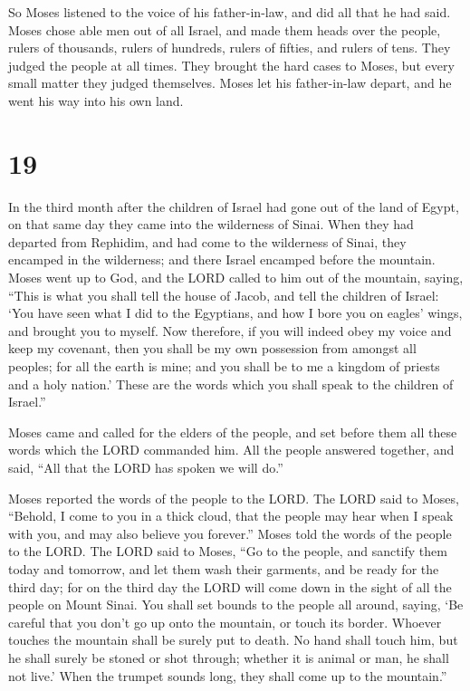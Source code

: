  So Moses listened to the voice of his father-in-law, and
did all that he had said.  Moses chose able men out of all
Israel, and made them heads over the people, rulers of thousands, rulers
of hundreds, rulers of fifties, and rulers of tens.  They
judged the people at all times. They brought the hard cases to Moses,
but every small matter they judged themselves.  Moses let
his father-in-law depart, and he went his way into his own land.

\hypertarget{section-18}{%
\section{19}\label{section-18}}

 In the third month after the children of Israel had gone
out of the land of Egypt, on that same day they came into the wilderness
of Sinai.  When they had departed from Rephidim, and had
come to the wilderness of Sinai, they encamped in the wilderness; and
there Israel encamped before the mountain.  Moses went up to
God, and the LORD called to him out of the mountain, saying, ``This is
what you shall tell the house of Jacob, and tell the children of Israel:
 `You have seen what I did to the Egyptians, and how I bore
you on eagles' wings, and brought you to myself.  Now
therefore, if you will indeed obey my voice and keep my covenant, then
you shall be my own possession from amongst all peoples; for all the
earth is mine;  and you shall be to me a kingdom of priests
and a holy nation.' These are the words which you shall speak to the
children of Israel.''

 Moses came and called for the elders of the people, and set
before them all these words which the LORD commanded him. 
All the people answered together, and said, ``All that the LORD has
spoken we will do.''

Moses reported the words of the people to the LORD.  The
LORD said to Moses, ``Behold, I come to you in a thick cloud, that the
people may hear when I speak with you, and may also believe you
forever.'' Moses told the words of the people to the LORD. 
The LORD said to Moses, ``Go to the people, and sanctify them today and
tomorrow, and let them wash their garments,  and be ready
for the third day; for on the third day the LORD will come down in the
sight of all the people on Mount Sinai.  You shall set
bounds to the people all around, saying, `Be careful that you don't go
up onto the mountain, or touch its border. Whoever touches the mountain
shall be surely put to death.  No hand shall touch him, but
he shall surely be stoned or shot through; whether it is animal or man,
he shall not live.' When the trumpet sounds long, they shall come up to
the mountain.''

